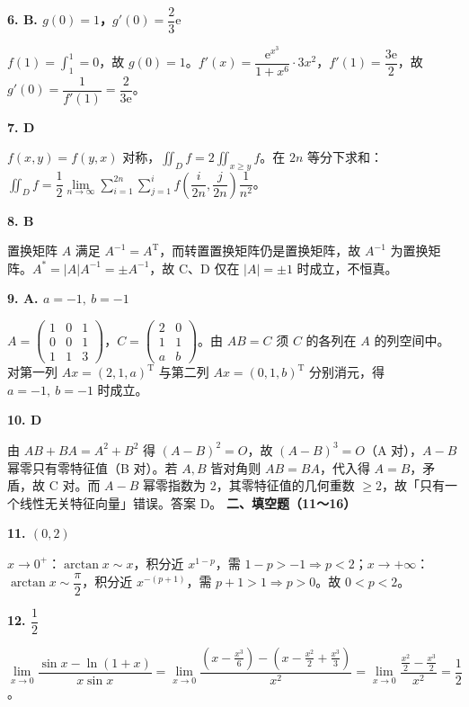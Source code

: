 \documentclass[UTF8,11pt]{ctexart}
\begin{document}
\par\noindent\textbf{6. B. $g(0)=1$，$g'(0)=\dfrac{2}{3}\mathrm{e}$}\par
$f(1)=\int_1^1=0$，故 $g(0)=1$。$f'(x)=\dfrac{\mathrm{e}^{x^3}}{1+x^6}\cdot3x^2$，$f'(1)=\dfrac{3\mathrm{e}}{2}$，故 $g'(0)=\dfrac{1}{f'(1)}=\dfrac{2}{3\mathrm{e}}$。
\par\noindent\textbf{7. D}\par
$f(x,y)=f(y,x)$ 对称，$\iint_D f=2\iint_{x\geqslant y}f$。在 $2n$ 等分下求和：$\iint_D f=\dfrac12\lim\limits_{n\to\infty}\sum\limits_{i=1}^{2n}\sum\limits_{j=1}^{i}f\left(\dfrac{i}{2n},\dfrac{j}{2n}\right)\dfrac1{n^2}$。
\par\noindent\textbf{8. B}\par
置换矩阵 $A$ 满足 $A^{-1}=A^{\mathrm{T}}$，而转置置换矩阵仍是置换矩阵，故 $A^{-1}$ 为置换矩阵。$A^*=|A|A^{-1}=\pm A^{-1}$，故 C、D 仅在 $|A|=\pm1$ 时成立，不恒真。
\par\noindent\textbf{9. A. $a=-1,\ b=-1$}\par
$A=\begin{pmatrix}1&0&1\\0&0&1\\1&1&3\end{pmatrix}$，$C=\begin{pmatrix}2&0\\1&1\\a&b\end{pmatrix}$。由 $AB=C$ 须 $C$ 的各列在 $A$ 的列空间中。对第一列 $Ax=(2,1,a)^{\mathrm{T}}$ 与第二列 $Ax=(0,1,b)^{\mathrm{T}}$ 分别消元，得 $a=-1,\ b=-1$ 时成立。
\par\noindent\textbf{10. D}\par
由 $AB+BA=A^2+B^2$ 得 $(A-B)^2=O$，故 $(A-B)^3=O$（A 对），$A-B$ 幂零只有零特征值（B 对）。若 $A,B$ 皆对角则 $AB=BA$，代入得 $A=B$，矛盾，故 C 对。而 $A-B$ 幂零指数为 $2$，其零特征值的几何重数 $\geqslant2$，故「只有一个线性无关特征向量」错误。答案 D。
{\Large\bfseries 二、填空题（11～16）}\par\vspace{4pt}
\par\noindent\textbf{11. $(0,2)$}\par
$x\to0^+$：$\arctan x\sim x$，积分近 $x^{1-p}$，需 $1-p>-1\Rightarrow p<2$；$x\to+\infty$：$\arctan x\sim\dfrac\pi2$，积分近 $x^{-(p+1)}$，需 $p+1>1\Rightarrow p>0$。故 $0<p<2$。
\par\noindent\textbf{12. $\dfrac12$}\par
$\lim\limits_{x\to0}\dfrac{\sin x-\ln(1+x)}{x\sin x}=\lim\limits_{x\to0}\dfrac{\left(x-\frac{x^3}{6}\right)-\left(x-\frac{x^2}{2}+\frac{x^3}{3}\right)}{x^2}=\lim\limits_{x\to0}\dfrac{\frac{x^2}{2}-\frac{x^3}{2}}{x^2}=\dfrac12$。
\end{document}
